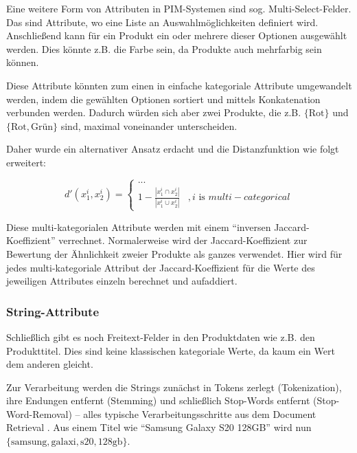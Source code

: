 Eine weitere Form von Attributen in PIM-Systemen sind sog.
Multi-Select-Felder. Das sind Attribute, wo eine Liste an
Auswahlmöglichkeiten definiert wird. Anschließend kann für ein Produkt
ein oder mehrere dieser Optionen ausgewählt werden. Dies könnte z.B. die
Farbe sein, da Produkte auch mehrfarbig sein können.

Diese Attribute könnten zum einen in einfache kategoriale Attribute
umgewandelt werden, indem die gewählten Optionen sortiert und mittels
Kon­ka­te­na­ti­on verbunden werden. Dadurch würden sich aber zwei Produkte,
die z.B. \(\{\text{Rot}\}\) und \(\{\text{Rot},\text{Grün}\}\) sind,
maximal voneinander unterscheiden.

Daher wurde ein alternativer Ansatz erdacht und die Distanzfunktion wie
folgt erweitert:

\begin{equation}
d'(x_1^i, x_2^i) = \begin{cases}
    ... \\
    1 - \frac{|x_1^i \cap x_2^i|}{|x_1^i \cup x_2^i|} &, i \text{ is } multi-categorical
\end{cases}
\end{equation}

Diese multi-kategorialen Attribute werden mit einem ``inversen
Jaccard-Koeffizient'' verrechnet. Normalerweise wird der
Jaccard-Koeffizient zur Bewertung der Ähnlichkeit zweier Produkte als
ganzes verwendet. Hier wird für jedes multi-kategoriale Attribut der
Jaccard-Koeffizient für die Werte des jeweiligen Attributes einzeln
berechnet und aufaddiert.

\hypertarget{string-attribute}{%
\subsubsection{String-Attribute}\label{string-attribute}}

Schließlich gibt es noch Freitext-Felder in den Produktdaten wie z.B.
den Produkttitel. Dies sind keine klassischen kategoriale Werte, da kaum
ein Wert dem anderen gleicht. \autocite{rajalingam2011}

Zur Verarbeitung werden die Strings zunächst in Tokens zerlegt
(Tokenization), ihre Endungen entfernt (Stemming) und schließlich
Stop-Words entfernt (Stop-Word-Removal) -- alles typische
Verarbeitungsschritte aus dem Document Retrieval \autocite{cohen2003}.
Aus einem Titel wie ``Samsung Galaxy S20 128GB'' wird nun
\(\{\text{samsung}, \text{galaxi}, \text{s20}, \text{128gb}\}\).

